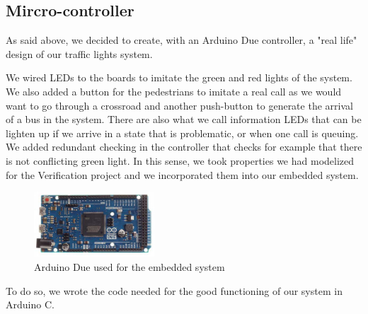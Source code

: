 \subsection{Mircro-controller}
As said above, we decided to create, with an Arduino Due controller, a "real life" design of our traffic lights system.

We wired LEDs to the boards to imitate the green and red lights of the system. We also added a button for the pedestrians to imitate a real call as we would want to go through a crossroad and another push-button to generate the arrival of a bus in the system. There are also what we call information LEDs that can be lighten up if we arrive in a state that is problematic, or when one call is queuing. 
We added redundant checking in the controller that checks for example that there is not conflicting green light. In this sense, we took  properties we had modelized for the Verification project and we incorporated them into our embedded system.

\begin{figure}[H]
	\label{fig:arduino}
  	\centering
    \includegraphics[width=0.4\textwidth]{picture/arduino.jpg}
    \caption{Arduino Due used for the embedded system}
\end{figure} 

To do so, we wrote the code needed for the good functioning of our system in Arduino C.